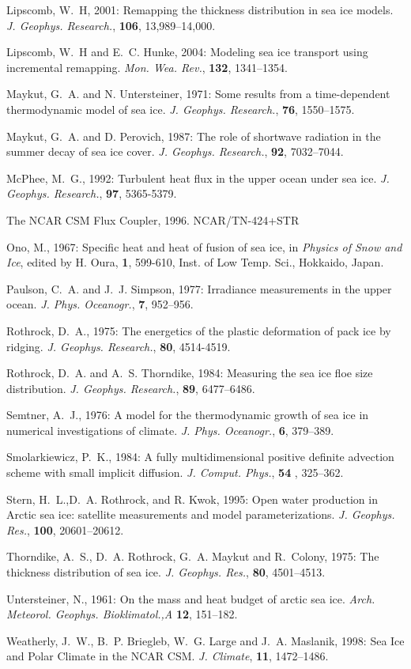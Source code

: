 Lipscomb, W.~H, 2001: Remapping the thickness distribution in sea ice models.
  {\it J. Geophys. Research.}, {\bf 106}, 13,989--14,000.

Lipscomb, W.~H and E.~C. Hunke, 2004: Modeling sea ice transport using
incremental remapping. {\it Mon. Wea. Rev.}, {\bf 132}, 1341--1354.

Maykut, G.~A. and N. Untersteiner, 1971: Some results from a time-dependent
thermodynamic model of sea ice. 
  {\it J. Geophys. Research.}, {\bf 76}, 1550--1575.

Maykut, G.~A. and D. Perovich, 1987: The role of shortwave radiation in the 
summer decay of sea ice cover.
  {\it J. Geophys. Research.}, {\bf 92}, 7032--7044.

McPhee, M.~G., 1992: Turbulent heat flux in the upper ocean under sea ice. 
  {\it J. Geophys. Research.}, {\bf 97}, 5365-5379.

The NCAR CSM Flux Coupler, 1996. NCAR/TN-424+STR 

Ono, M., 1967: Specific heat and heat of fusion of sea ice, in {\it Physics
  of Snow and Ice}, edited by H. Oura, {\bf 1}, 599-610, 
  Inst. of Low Temp. Sci., Hokkaido, Japan.

Paulson, C.~A. and J.~J. Simpson, 1977: Irradiance measurements in the upper ocean.
  {\it J. Phys. Oceanogr.}, {\bf 7}, 952--956.

Rothrock, D.~A., 1975: The energetics of the plastic deformation of pack ice by ridging.
  {\it J. Geophys. Research.}, {\bf 80}, 4514-4519.

Rothrock, D.~A. and A.~S. Thorndike, 1984: Measuring the sea ice floe size distribution.
  {\it J. Geophys. Research.}, {\bf 89}, 6477--6486.

Semtner, A.~J., 1976: A model for the thermodynamic growth of sea ice in
  numerical investigations of climate. {\it J. Phys. Oceanogr.}, {\bf 6},
  379--389.

Smolarkiewicz, P.~K., 1984: A fully multidimensional positive definite
  advection scheme with small implicit diffusion. {\it J. Comput. Phys.},
  {\bf 54 }, 325--362.

Stern, H.~L.,D.~A. Rothrock, and R. Kwok, 1995: Open water production in 
  Arctic sea ice: satellite measurements and model parameterizations.
  {\it J. Geophys. Res.}, {\bf 100}, 20601--20612.

Thorndike, A.~S., D.~A. Rothrock, G.~A. Maykut and R.~Colony, 1975: The
  thickness distribution of sea ice. {\it J. Geophys. Res.}, {\bf 80},
  4501--4513.

Untersteiner, N., 1961: On the mass and heat budget of arctic sea ice.
  {\it Arch. Meteorol. Geophys. Bioklimatol.,A} {\bf 12}, 151--182.

Weatherly, J.~W., B.~P. Briegleb, W.~G. Large and J.~A. Maslanik, 1998: 
  Sea Ice and Polar Climate in the NCAR CSM.
  {\it J. Climate}, {\bf 11}, 1472--1486.

\vfill\eject

\bye
